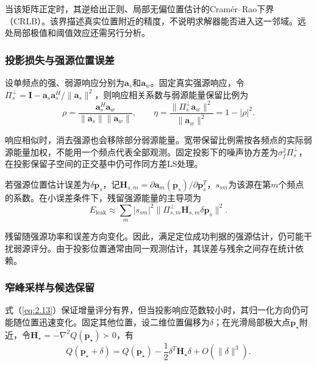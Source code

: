 \documentclass[11pt,a4paper]{article}
\numberwithin{equation}{section}
\numberwithin{figure}{section}
\numberwithin{table}{section}
\begin{document}
当该矩阵正定时，其逆给出正则、局部无偏位置估计的Cramér--Rao下界（CRLB）。该界描述真实位置附近的精度，不说明求解器能否进入这一邻域。远处局部极值和阈值效应还需另行分析\cite{ref11}。

\subsubsection{投影损失与强源位置误差}\label{sec:2.5.2}

设单频点的强、弱源响应分别为$\mathbf{a}_s$和$\mathbf{a}_w$。固定真实强源响应，令$\Pi_s^\perp=\mathbf{I}-\mathbf{a}_s\mathbf{a}_s^H/\|\mathbf{a}_s\|^2$，则响应相关系数与弱源能量保留比例为
\begin{equation}\label{eq:2.15}
\rho =\frac{\mathbf{a}_s^H\mathbf{a}_w}{\|\mathbf{a}_s\|\|\mathbf{a}_w\|}, \qquad \eta =\frac{\|\Pi_s^\perp\mathbf{a}_w\|^2}{\|\mathbf{a}_w\|^2} =1-|\rho|^2.
\end{equation}

响应相似时，消去强源也会移除部分弱源能量。宽带保留比例需按各频点的实际弱源能量加权，不能用一个频点代表全部观测。固定投影下的噪声协方差为$\sigma_f^2\Pi_s^\perp$，在投影保留子空间的正交基中仍可作同方差LS处理。

若强源位置估计误差为$\delta\mathbf{p}_s$，记$\mathbf{H}_{s,m}=\partial\mathbf{a}_m(\mathbf{p}_s)/\partial\mathbf{p}_s^T$，$s_{sm}$为该源在第$m$个频点的系数。在小误差条件下，残留强源能量的主导项为
\begin{equation}\label{eq:2.16}
E_{\mathrm{leak}} \approx \sum_m |s_{sm}|^2 \|\Pi_{s,m}^\perp\mathbf{H}_{s,m}\delta\mathbf{p}_s\|^2.
\end{equation}

残留随强源功率和误差方向变化。因此，满足定位成功判据的强源估计，仍可能干扰弱源评分。由于投影位置通常由同一观测估计，其误差与残余之间存在统计依赖。

\subsubsection{窄峰采样与候选保留}\label{sec:2.5.3}

式（\ref{eq:2.13}）保证增量评分有界，但当投影响应范数较小时，其归一化方向仍可能随位置迅速变化。固定其他位置，设二维位置偏移为$\delta$；在光滑局部极大点$\mathbf{p}_\star$附近，令$\mathbf{H}_\star=-\nabla^2Q(\mathbf{p}_\star)\succ0$，有
\begin{equation}\label{eq:2.17}
Q(\mathbf{p}_\star+\delta) =Q(\mathbf{p}_\star) -\frac12\delta^T\mathbf{H}_\star\delta +O(\|\delta\|^3).
\end{equation}
\end{document}
